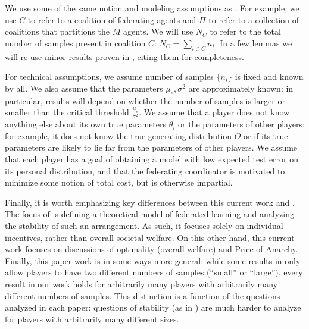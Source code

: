 \documentclass{article}
\newcommand{\nplayer}[0]{\ensuremath{M}}
\newcommand{\mean}[0]{\ensuremath{\theta}}
\newcommand{\mue}[0]{\ensuremath{\mu_e}}
\newcommand{\var}[0]{\ensuremath{\sigma^2}}
\newcommand{\ndraw}[0]{\ensuremath{n}}
\newcommand{\total}[0]{\ensuremath{N}}
\newcommand{\col}[0]{\ensuremath{C}}
\newcommand{\partition}[0]{\ensuremath{\Pi}}
\begin{document}
{We use some of the same notion and modeling assumptions as \cite{donahue2020model}. For example, we use $\col$ to refer to a coalition of federating agents and $\partition$ to refer to a collection of coalitions that partitions the $\nplayer$ agents. We will use $\total_{\col}$ to refer to the total number of samples present in coalition $\col$: $\total_{\col} = \sum_{i \in \col}\ndraw_i$. In a few lemmas we will re-use minor results proven in \cite{donahue2020model}, citing them for completeness. 

For technical assumptions, we assume number of samples $\{\ndraw_i\}$ is fixed and known by all. We also assume that the parameters $\mue, \var$ are approximately known: in particular, results will depend on whether the number of samples is larger or smaller than the critical threshold $\frac{\mue}{\var}$. We assume that a player does not know anything else about its own true parameters $\mean_i$ or the parameters of other players: for example, it does not know the true generating distribution $\Theta$ or if its true parameters are likely to lie far from the parameters of other players. We assume that each player has a goal of obtaining a model with low expected test error on its personal distribution, and that the federating coordinator is motivated to minimize some notion of total cost, but is otherwise impartial. 

Finally, it is worth emphasizing key differences between this current work and \cite{donahue2020model}. The focus of \cite{donahue2020model} is defining a theoretical model of federated learning and analyzing the stability of such an arrangement. As such, it focuses solely on individual incentives, rather than overall societal welfare. On this other hand, this current work focuses on discussions of optimality (overall welfare) and Price of Anarchy. Finally, this paper work is in some ways more general: while some results in \cite{donahue2020model} only allow players to have two different numbers of samples (\enquote{small} or \enquote{large}), every result in our work holds for arbitrarily many players with arbitrarily many different numbers of samples. This distinction is a function of the questions analyzed in each paper: questions of stability (as in \cite{donahue2020model}) are much harder to analyze for players with arbitrarily many different sizes. 

}
\end{document}
